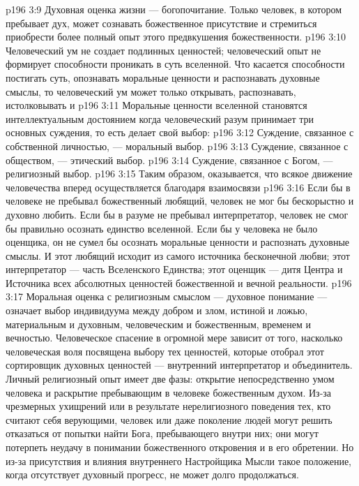 \vs p196 3:9 \bibnobreakspace Духовная оценка жизни --- богопочитание. Только человек, в котором пребывает дух, может сознавать божественное присутствие и стремиться приобрести более полный опыт этого предвкушения божественности.
\vs p196 3:10 \pc Человеческий ум не создает подлинных ценностей; человеческий опыт не формирует способности проникать в суть вселенной. Что касается способности постигать суть, опознавать моральные ценности и распознавать духовные смыслы, то человеческий ум может только открывать, распознавать, истолковывать и 
\vs p196 3:11 Моральные ценности вселенной становятся интеллектуальным достоянием когда человеческий разум принимает три основных суждения, то есть делает свой выбор:
\vs p196 3:12 \bibnobreakspace Суждение, связанное с собственной личностью, --- моральный выбор.
\vs p196 3:13 \bibnobreakspace Суждение, связанное с обществом, --- этический выбор.
\vs p196 3:14 \bibnobreakspace Суждение, связанное с Богом, --- религиозный выбор.
\vs p196 3:15 \pc Таким образом, оказывается, что всякое движение человечества вперед осуществляется благодаря взаимосвязи 
\vs p196 3:16 Если бы в человеке не пребывал божественный любящий, человек не мог бы бескорыстно и духовно любить. Если бы в разуме не пребывал интерпретатор, человек не смог бы правильно осознать единство вселенной. Если бы у человека не было оценщика, он не сумел бы осознать моральные ценности и распознать духовные смыслы. И этот любящий исходит из самого источника бесконечной любви; этот интерпретатор --- часть Вселенского Единства; этот оценщик --- дитя Центра и Источника всех абсолютных ценностей божественной и вечной реальности.
\vs p196 3:17 Моральная оценка с религиозным смыслом --- духовное понимание --- означает выбор индивидуума между добром и злом, истиной и ложью, материальным и духовным, человеческим и божественным, временем и вечностью. Человеческое спасение в огромной мере зависит от того, насколько человеческая воля посвящена выбору тех ценностей, которые отобрал этот сортировщик духовных ценностей --- внутренний интерпретатор и объединитель. Личный религиозный опыт имеет две фазы: открытие непосредственно умом человека и раскрытие пребывающим в человеке божественным духом. Из\hyp{}за чрезмерных ухищрений или в результате нерелигиозного поведения тех, кто считают себя верующими, человек или даже поколение людей могут решить отказаться от попытки найти Бога, пребывающего внутри них; они могут потерпеть неудачу в понимании божественного откровения и в его обретении. Но из\hyp{}за присутствия и влияния внутреннего Настройщика Мысли такое положение, когда отсутствует духовный прогресс, не может долго продолжаться.
